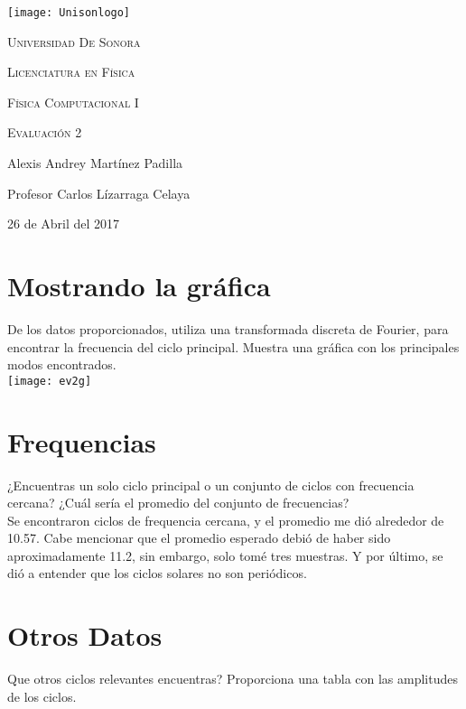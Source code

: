 \documentclass[12pt,a4paper]{article}
\begin{document}
\begin{titlepage}
	\centering
	\texttt{[image: Unisonlogo]}\par
    \vspace{1.3cm}
	\scshape \LARGE Universidad De Sonora \par
	\vspace{1cm}
	\scshape \Large Licenciatura en Física \par
    \scshape \Large Física Computacional I \par
	\vspace{1.5cm}
	\huge \scshape Evaluación 2 \par
	\vspace{2cm}
	\Large Alexis Andrey Martínez Padilla\par
    \Large Profesor Carlos Lízarraga Celaya\par
    \vspace{2.5cm}
    \Large 26 de Abril del 2017
\end{titlepage}

\section{Mostrando la gráfica}

De los datos proporcionados, utiliza una transformada discreta de Fourier, para encontrar la frecuencia del ciclo principal. Muestra una gráfica con los principales modos encontrados. \\ 

\texttt{[image: ev2g]}

\section{Frequencias}

¿Encuentras un solo ciclo principal o un conjunto de ciclos con frecuencia cercana? ¿Cuál sería el promedio del conjunto de frecuencias? \\

Se encontraron ciclos de frequencia cercana, y el promedio me dió alrededor de 10.57. Cabe mencionar que el promedio esperado debió de haber sido aproximadamente 11.2, sin embargo, solo tomé tres muestras. Y por último, se dió a entender que los ciclos solares no son periódicos.

\section{Otros Datos}
Que otros ciclos relevantes encuentras? Proporciona una tabla con las amplitudes de los ciclos. \\
\end{document}
